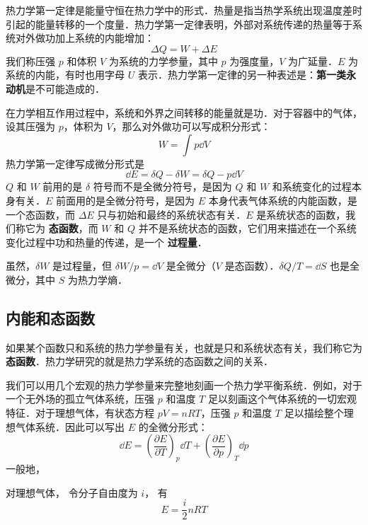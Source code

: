 
\begin{issues}
\issueDraft
\end{issues}


热力学第一定律是能量守恒在热力学中的形式．热量是指当热学系统出现温度差时引起的能量转移的一个度量．热力学第一定律表明，外部对系统传递的热量等于系统对外做功加上系统的内能增加：
\begin{equation}\label{Th1Law_eq1}
\Delta Q = W + \Delta E
\end{equation}
我们称压强 $p$ 和体积 $V$ 为系统的力学参量，其中 $p$ 为强度量，$V$ 为广延量．$E$ 为系统的内能，有时也用字母 $U$ 表示．热力学第一定律的另一种表述是：\textbf{第一类永动机}是不可能造成的．


在力学相互作用过程中，系统和外界之间转移的能量就是功．对于容器中的气体，设其压强为 $p$，体积为 $V$，那么对外做功可以写成积分形式：
\begin{equation}
W = \int p \dd{V}
\end{equation}
热力学第一定律写成微分形式是
\begin{equation}\label{Th1Law_eq2}
\dd E=\delta Q-\delta W=\delta Q-p\dd V
\end{equation}
$Q$ 和 $W$ 前用的是 $\delta$ 符号而不是全微分符号，是因为 $Q$ 和 $W$ 和系统变化的过程本身有关．$E$ 前面用的是全微分符号，是因为 $E$ 本身代表气体系统的内能函数，是一个态函数，而 $\Delta E$ 只与初始和最终的系统状态有关．$E$ 是系统状态的函数，我们称它为 \textbf{态函数}，而 $W$ 和 $Q$ 并不是系统状态的函数，它们用来描述在一个系统变化过程中功和热量的传递，是一个 \textbf{过程量}．

虽然，$\delta W$ 是过程量，但 $\delta W/p=\dd V$ 是全微分（$V$ 是态函数）．$\delta Q/T=\dd S$ 也是全微分，其中 $S$ 为热力学熵．

\subsection{内能和态函数}
如果某个函数只和系统的热力学参量有关，也就是只和系统状态有关，我们称它为\textbf{态函数}．热力学研究的就是热力学系统的态函数之间的关系．

我们可以用几个宏观的热力学参量来完整地刻画一个热力学平衡系统．例如，对于一个无外场的孤立气体系统，压强 $p$ 和温度 $T$ 足以刻画这个气体系统的一切宏观特征．对于理想气体，有状态方程 $pV=nRT$，压强 $p$ 和温度 $T$ 足以描绘整个理想气体系统．因此可以写出 $E$ 的全微分形式：
\begin{equation}
\dd E=\left(\frac{\partial E}{\partial T}\right)_p \dd T + \left(\frac{\partial E}{\partial p}\right)_T \dd p
\end{equation}
一般地，



对理想气体， 令分子自由度为 $i$， 有
\begin{equation}
E = \frac{i}{2}n RT
\end{equation}

